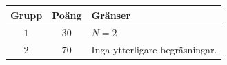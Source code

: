 
\begin{center}
\begin{tabular}{| c | c | l |}
  \hline
  \textbf{Grupp} & \textbf{Poäng} & \textbf{Gränser} \\ \hline
  $1$    & $30$  & $N = 2$ \\ \hline
  $2$    & $70$  & Inga ytterligare begräsningar. \\ \hline
\end{tabular}
\end{center}

